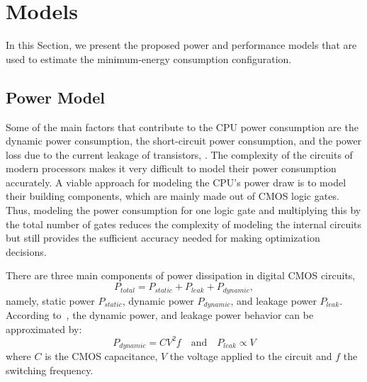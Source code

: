 

\section{Models} \label{sec:models}
In this Section, we present the proposed power and performance models that are used to estimate the minimum-energy consumption configuration.

\subsection{Power Model} \label{sec:powermodel}
Some of the main factors that contribute to the CPU power consumption are the dynamic power consumption, the short-circuit power consumption, and the power loss due to the current leakage of transistors, \cite{Rauber2014, Goel2016, Du2017, Gonzalez1997}. The complexity of the circuits of modern processors makes it very difficult to model their power consumption accurately. A viable approach for modeling the CPU's power draw is to model their building components, which are mainly made out of CMOS logic gates. Thus, modeling the power consumption for one logic gate and multiplying this by the total number of gates reduces the complexity of modeling the internal circuits but still provides the sufficient accuracy needed for making optimization decisions.

There are three main components of power dissipation in digital CMOS circuits,
\begin{equation}
P_{total}=P_{static}+P_{leak}+P_{dynamic} \label{eq_totalPower},
\end{equation}
namely, static power $P_{static}$, dynamic power $P_{dynamic}$, and leakage power $P_{leak}$.
According to~\cite{Sarwar1997, Butzen2007}, the dynamic power, and leakage power behavior can be approximated by:
\begin{equation}
P_{dynamic}=CV^2f \quad \text{and} \quad P_{leak} \propto V
\label{eq_draws}
\end{equation}
where $C$ is the CMOS capacitance, $V$ the voltage applied to the circuit and $f$ the switching frequency.

